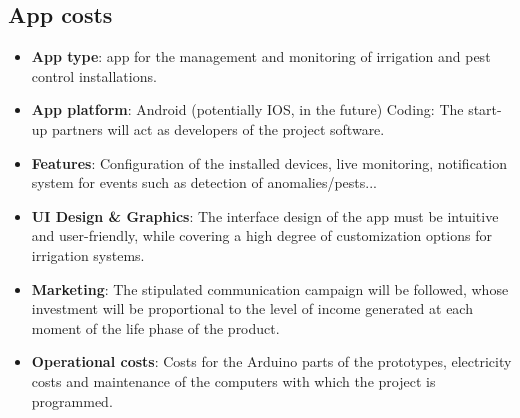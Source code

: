 \documentclass[11pt,a4paper]{article}
\begin{document}
\subsection{App costs}
\begin{itemize}
\item \textbf{App type}: app for the management and monitoring of irrigation and pest control installations. 
\item \textbf{App platform}: Android (potentially IOS, in the future)
Coding: The start-up partners will act as developers of the project software. 
\item \textbf{Features}: Configuration of the installed devices, live monitoring, notification system for events such as detection of anomalies/pests...
\item \textbf{UI Design \& Graphics}: The interface design of the app must be intuitive and user-friendly, while covering a high degree of customization options for irrigation systems. 
\item \textbf{Marketing}: The stipulated communication campaign will be followed, whose investment will be proportional to the level of income generated at each moment of the life phase of the product. 
\item \textbf{Operational costs}: Costs for the Arduino parts of the prototypes, electricity costs and maintenance of the computers with which the project is programmed. 
\end{itemize}
\end{document}
